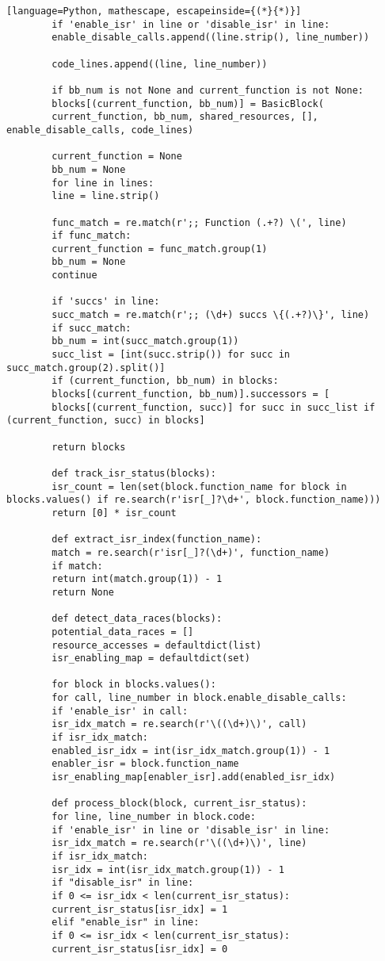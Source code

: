 \documentclass[
fancyheadings, %
%
%
]{stsreprt}
\begin{document}
\begin{lstlisting}[language=Python, mathescape, escapeinside={(*}{*)}]
		if 'enable_isr' in line or 'disable_isr' in line:
		enable_disable_calls.append((line.strip(), line_number))
		
		code_lines.append((line, line_number))
		
		if bb_num is not None and current_function is not None:
		blocks[(current_function, bb_num)] = BasicBlock(
		current_function, bb_num, shared_resources, [], enable_disable_calls, code_lines)
		
		current_function = None
		bb_num = None
		for line in lines:
		line = line.strip()
		
		func_match = re.match(r';; Function (.+?) \(', line)
		if func_match:
		current_function = func_match.group(1)
		bb_num = None
		continue
		
		if 'succs' in line:
		succ_match = re.match(r';; (\d+) succs \{(.+?)\}', line)
		if succ_match:
		bb_num = int(succ_match.group(1))
		succ_list = [int(succ.strip()) for succ in succ_match.group(2).split()]
		if (current_function, bb_num) in blocks:
		blocks[(current_function, bb_num)].successors = [
		blocks[(current_function, succ)] for succ in succ_list if (current_function, succ) in blocks]
		
		return blocks
		
		def track_isr_status(blocks):
		isr_count = len(set(block.function_name for block in blocks.values() if re.search(r'isr[_]?\d+', block.function_name)))
		return [0] * isr_count  
		
		def extract_isr_index(function_name):
		match = re.search(r'isr[_]?(\d+)', function_name)
		if match:
		return int(match.group(1)) - 1
		return None
		
		def detect_data_races(blocks):
		potential_data_races = []
		resource_accesses = defaultdict(list)
		isr_enabling_map = defaultdict(set)
		
		for block in blocks.values():
		for call, line_number in block.enable_disable_calls:
		if 'enable_isr' in call:
		isr_idx_match = re.search(r'\((\d+)\)', call)
		if isr_idx_match:
		enabled_isr_idx = int(isr_idx_match.group(1)) - 1
		enabler_isr = block.function_name
		isr_enabling_map[enabler_isr].add(enabled_isr_idx)
		
		def process_block(block, current_isr_status):
		for line, line_number in block.code:
		if 'enable_isr' in line or 'disable_isr' in line:
		isr_idx_match = re.search(r'\((\d+)\)', line)
		if isr_idx_match:
		isr_idx = int(isr_idx_match.group(1)) - 1  
		if "disable_isr" in line:
		if 0 <= isr_idx < len(current_isr_status):
		current_isr_status[isr_idx] = 1
		elif "enable_isr" in line:
		if 0 <= isr_idx < len(current_isr_status):
		current_isr_status[isr_idx] = 0
		

\end{lstlisting}
\end{document}
